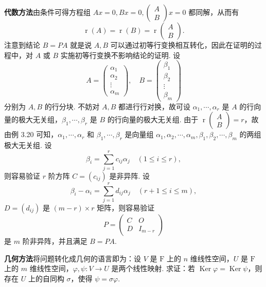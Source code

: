 \documentclass[UTF8,12pt,a4paper,fontset=fandol]{ctexart}
\begin{document}
\noindent\textbf{代数方法}\quad 由条件可得方程组 $Ax=0,Bx=0,\left(\begin{array}{c}A\\B\end{array}\right)x=0$ 都同解，从而有
\[
\operatorname{r}(A)=\operatorname{r}(B)=\operatorname{r}\left(\begin{array}{c}A\\B\end{array}\right).
\]
注意到结论 $B=PA$ 就是说 $A,B$ 可以通过初等行变换相互转化，因此在证明的过程中，对 $A$ 或 $B$ 实施初等行变换不影响结论的证明. 设
\[
A=\left(\begin{array}{c}
\alpha_1\\ \alpha_2\\ \vdots\\ \alpha_m
\end{array}\right),\quad
B=\left(\begin{array}{c}
\beta_1\\ \beta_2\\ \vdots\\ \beta_m
\end{array}\right)
\]
分别为 $A,B$ 的行分块. 不妨对 $A,B$ 都进行行对换，故可设 $\alpha_1,\cdots,\alpha_r$ 是 $A$ 的行向量的极大无关组，$\beta_1,\cdots,\beta_r$ 是 $B$ 的行向量的极大无关组. 由于 $\operatorname{r}\left(\begin{array}{c}A\\B\end{array}\right)=r$，故由例 3.20 可知，$\alpha_1,\cdots,\alpha_r$ 和 $\beta_1,\cdots,\beta_r$ 是向量组 $\alpha_1,\alpha_2,\cdots,\alpha_m,\beta_1,\beta_2,\cdots,\beta_m$ 的两组极大无关组. 设
\[
\beta_i=\sum_{j=1}^r c_{ij}\alpha_j\quad (1\le i\le r),
\]
则容易验证 $r$ 阶方阵 $C=(c_{ij})$ 是非异阵. 设
\[
\beta_i-\alpha_i=\sum_{j=1}^r d_{ij}\alpha_j\quad (r+1\le i\le m),
\]
$D=(d_{ij})$ 是 $(m-r)\times r$ 矩阵，则容易验证
\[
P=\left(\begin{array}{cc}
C & O\\
D & I_{m-r}
\end{array}\right)
\]
是 $m$ 阶非异阵，并且满足 $B=PA$.

\noindent\textbf{几何方法}\quad 将问题转化成几何的语言即为：设 $V$ 是 $\mathrm{F}$ 上的 $n$ 维线性空间，$U$ 是 $\mathrm{F}$ 上的 $m$ 维线性空间，$\varphi,\psi:V\to U$ 是两个线性映射. 求证：若 $\operatorname{Ker}\varphi=\operatorname{Ker}\psi$，则存在 $U$ 上的自同构 $\sigma$，使得 $\psi=\sigma\varphi$.
\end{document}
